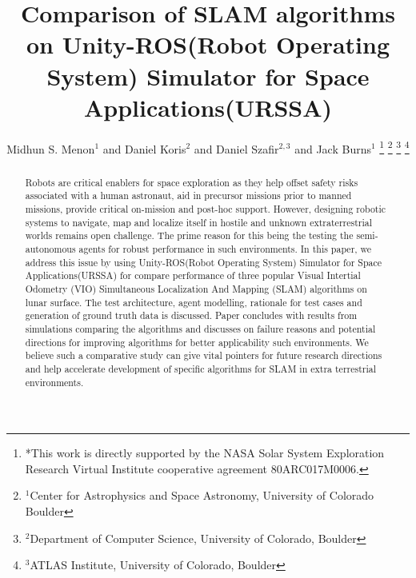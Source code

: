 \documentclass[a4paper, 10pt, conference]{ieeeconf}      %
\title{\LARGE \bf
Comparison of SLAM algorithms on Unity-ROS(Robot Operating System) Simulator for Space Applications(URSSA)
}
\author{Midhun S. Menon$^{1}$ and Daniel Koris$^{2}$ and Daniel Szafir$^{2,3}$ and Jack Burns$^{1}$%
\thanks{*This work is directly supported by the NASA Solar System Exploration Research Virtual Institute cooperative agreement 80ARC017M0006.}%
\thanks{$^{1}$Center for Astrophysics and Space Astronomy, University of Colorado Boulder}%
\thanks{$^{2}$Department of Computer Science, University of Colorado, Boulder}%
\thanks{$^{3}$ATLAS Institute, University of Colorado, Boulder}%
}
\begin{document}

\thispagestyle{empty}
\pagestyle{empty}


\begin{abstract}
Robots are critical enablers for space exploration as they help offset safety risks associated with a human astronaut, aid in precursor missions prior to manned missions, provide critical on-mission and post-hoc support. However, designing robotic systems to navigate, map and localize itself in hostile and unknown extraterrestrial worlds remains open challenge. The prime reason for this being the testing the semi-autonomous agents  for robust performance in such environments. In this paper, we address this issue by using Unity-ROS(Robot Operating System) Simulator for Space Applications(URSSA) for compare performance of three popular Visual Intertial Odometry (VIO) Simultaneous Localization And Mapping (SLAM) algorithms on lunar surface. The test architecture, agent modelling, rationale for test cases and generation of ground truth data is discussed. Paper concludes with results from simulations comparing the algorithms and discusses on failure reasons and potential directions for improving algorithms for better applicability such environments. We believe such a comparative study can give vital pointers for future research directions and help accelerate development of specific algorithms for SLAM in extra terrestrial environments.

\end{abstract}
\end{document}
